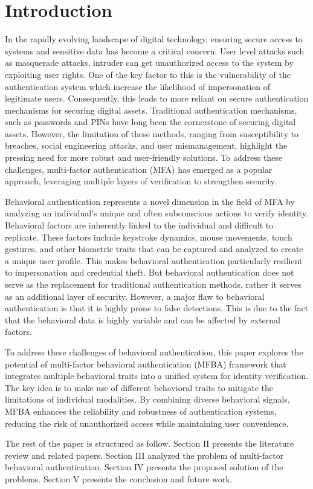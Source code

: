 
\section{Introduction}

In the rapidly evolving landscape of digital technology, ensuring secure access to systems and sensitive data has become a critical concern. 
User level attacks such as masquerade attacks, intruder can get unauthorized access to the system by exploiting user rights.
One of the key factor to this is the vulnerability of the authentication system
which increase the likelihood of impersonation of legitimate users.
Consequently, this leads to more reliant on secure authentication mechanisms for securing digital assets.  
Traditional authentication mechanisms, such as passwords and PINs have long been the cornerstone of securing digital assets. However, the limitation of these methods, ranging from susceptibility to breaches, social engineering attacks, and user mismanagement, highlight the pressing need for more robust and user-friendly solutions. To address these challenges, multi-factor authentication (MFA) has emerged as a popular approach, leveraging multiple layers of verification to strengthen security.

Behavioral authentication represents a novel dimension in the field of MFA by analyzing an individual's unique and often subconscious actions to verify identity.
Behavioral factors are inherently linked to the individual and difficult to replicate.
These factors include keystroke dynamics, mouse movements, touch gestures, and other biometric traits that can be captured and analyzed to create a unique user profile.
This makes behavioral authentication particularly resilient to impersonation and credential theft.
But behavioral authentication does not serve as the replacement for traditional authentication methods, rather it serves as an additional layer of security. 
However, a major flaw to behavioral authentication is that it is highly prone to false detections.
This is due to the fact that the behavioral data is highly variable and can be affected by external factors.

To address these challenges of behavioral authentication, 
this paper explores the potential of multi-factor behavioral authentication (MFBA) framework that integrates multiple behavioral traits into a unified system for identity verification.
The key idea is to make use of different behavioral traits to mitigate the limitations of individual modalities.
By combining diverse behavioral signals, MFBA enhances the reliability and robustness of authentication systems, reducing the risk of unauthorized access while maintaining user convenience.

The rest of the paper is structured as follow.
Section II presents the literature review and related papers.
Section III analyzed the problem of multi-factor behavioral authentication. 
Section IV presents the proposed solution of the problems.
Section V presents the conclusion and future work.
